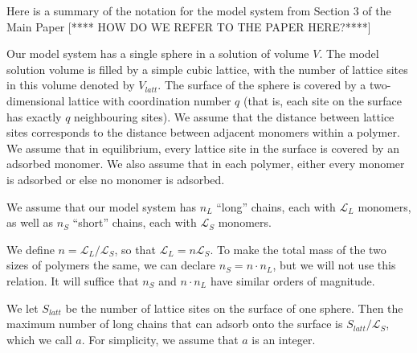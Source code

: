 \documentclass[journal=mamobx,manuscript=article]{achemso}
\newcommand{\leng}{\mathcal{L}}
\begin{document}
Here is a summary of the notation for the model system 
from Section 3 of the Main Paper [**** HOW DO WE 
REFER TO THE PAPER HERE?****]

Our model system has a single sphere in a solution of
volume $V$.  The model solution volume is filled by a 
simple cubic lattice, with the number of lattice sites in this volume denoted by $V_{latt}$.
The surface of the sphere is covered by a  two-dimensional lattice with coordination number $q$ 
(that is, each site on the surface has exactly $q$ neighbouring sites).  We assume that 
the distance between lattice sites corresponds to the distance between adjacent monomers within a 
polymer.  We assume that in equilibrium, every lattice site in the surface is covered by an adsorbed 
monomer.  We also assume that in each polymer, either every 
monomer is adsorbed or else no monomer is adsorbed.
 



We assume that our model system has $n_L$ ``long'' chains, each
with $\leng_L$ monomers, as well as $n_S$ ``short''
chains, each with $\leng_S$ monomers.

We define $n=\leng_L/\leng_S$, so that $\leng_L=n\leng_S$.   To make the total mass
of the two sizes of polymers the same, we can
declare $n_S=n \cdot n_L$, but we will not use
this relation.  It will suffice that $n_S$ and 
$n\cdot n_L$ have similar orders of magnitude.

We let $S_{latt}$ be the number of lattice sites on 
the surface of one sphere.  Then the maximum number of 
long chains that can adsorb onto the surface is 
$S_{latt}/\leng_S$, which we call $a$. For 
simplicity, we assume that $a$ is an integer.


\end{document}
